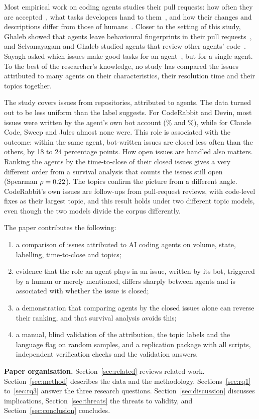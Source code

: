 Most empirical work on coding agents studies their pull requests: how often they are accepted~\cite{li2025aiteammates,pinna2026comparing}, what tasks developers hand to them~\cite{watanabe2025agentic}, and how their changes and descriptions differ from those of humans~\cite{pham2026alignment}. Closer to the setting of this study, Ghaleb showed that agents leave behavioural fingerprints in their pull requests~\cite{ghaleb2026fingerprinting}, and Selvanayagam and Ghaleb studied agents that review other agents' code~\cite{selvanayagam2026aitoai}. Sayagh asked which issues make good tasks for an agent~\cite{sayagh2025copilot}, but for a single agent. To the best of the researcher's knowledge, no study has compared the issues attributed to many agents on their characteristics, their resolution time and their topics together.

The study covers \NIssues{} issues from \NRepos{} repositories, attributed to \NAgents{} agents. The data turned out to be less uniform than the label suggests. For CodeRabbit and Devin, most issues were written by the agent's own bot account (\OwnBotShareCoderabbit\% and \OwnBotShareDevin\%), while for Claude Code, Sweep and Jules almost none were. This role is associated with the outcome: within the same agent, bot-written issues are closed less often than the others, by 18 to 24 percentage points. How open issues are handled also matters. Ranking the agents by the time-to-close of their closed issues gives a very different order from a survival analysis that counts the issues still open (Spearman \(\rho = 0.22\)). The topics confirm the picture from a different angle. CodeRabbit's own issues are follow-ups from pull-request reviews, with code-level fixes as their largest topic, and this result holds under two different topic models, even though the two models divide the corpus differently.

The paper contributes the following:
\begin{enumerate}
\item a comparison of issues attributed to \NAgents{} AI coding agents on volume, state, labelling, time-to-close and topics;
\item evidence that the role an agent plays in an issue, written by its bot, triggered by a human or merely mentioned, differs sharply between agents and is associated with whether the issue is closed;
\item a demonstration that comparing agents by the closed issues alone can reverse their ranking, and that survival analysis avoids this;
\item a manual, blind validation of the attribution, the topic labels and the language flag on random samples, and a replication package with all scripts, independent verification checks and the validation answers.
\end{enumerate}

\textbf{Paper organisation.} Section~\ref{sec:related} reviews related work. Section~\ref{sec:method} describes the data and the methodology. Sections~\ref{sec:rq1} to~\ref{sec:rq3} answer the three research questions. Section~\ref{sec:discussion} discusses implications, Section~\ref{sec:threats} the threats to validity, and Section~\ref{sec:conclusion} concludes.
